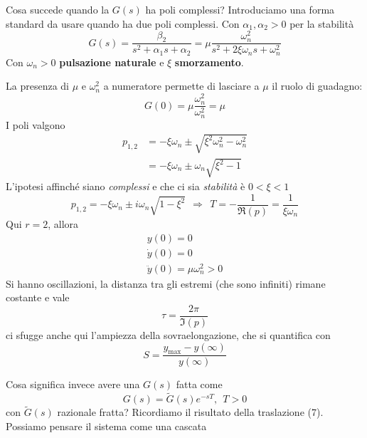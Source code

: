 \documentclass[10pt,a4paper]{book}
\begin{document}
Cosa succede quando la $G(s)$ ha poli complessi? Introduciamo una forma standard da usare quando ha due poli complessi. Con $\alpha _1 ,\alpha _2  >0$ per la stabilità
\begin{equation*}
	G(s) =\frac{\beta _2}{s^2 +\alpha _1 s+\alpha _2} =\mu \frac{\omega ^2_n}{s^2 +2\xi \omega _n s+\omega ^2_n}
\end{equation*}
Con $\omega _n  >0$ \textbf{pulsazione naturale} e $\xi $ \textbf{smorzamento}.

La presenza di $\mu $ e $\omega ^2_n$ a numeratore permette di lasciare a $\mu $ il ruolo di guadagno:
\begin{equation*}
	G(0) =\mu \frac{\omega ^2_n}{\omega ^2_n} =\mu 
\end{equation*}
I poli valgono
\begin{equation*}
	\begin{aligned}
		p_{1,2} & =-\xi \omega _n \pm \sqrt{\xi ^2 \omega ^2_n -\omega ^2_n} \\
		        & =-\xi \omega _n \pm \omega _n\sqrt{\xi ^2 -1}              
	\end{aligned}
\end{equation*}
L'ipotesi affinché siano \textit{complessi} e che ci sia \textit{stabilità} è $0< \xi < 1$
\begin{equation*}
	p_{1,2} =-\xi \omega _n \pm i\omega _n\sqrt{1-\xi ^2} \ \ \Rightarrow \ \ T=-\frac{1}{\Re(p)} =\frac{1}{\xi \omega _n}
\end{equation*}
Qui $r=2$, allora
\begin{gather*}
	y(0) =0\\
	\dot{y}(0) =0\\
	\ddot{y}(0) =\mu \omega ^2_n  >0
\end{gather*}
Si hanno oscillazioni, la distanza tra gli estremi (che sono infiniti) rimane costante e vale
\begin{equation*}
	\boxed{\tau =\frac{2\pi }{\Im(p)}}
\end{equation*}
ci sfugge anche qui l'ampiezza della sovraelongazione, che si quantifica con
\begin{equation*}
	\boxed{S=\frac{y_{\text{max}} -y(\infty)}{y(\infty)}}
\end{equation*}

Cosa significa invece avere una $G(s)$ fatta come
\begin{equation*}
	G(s) =\tilde{G}(s) e^{-sT} ,\ \ T >0
\end{equation*}
con $\tilde{G}(s)$ razionale fratta? Ricordiamo il risultato della traslazione (7). Possiamo pensare il sistema come una cascata
\end{document}
